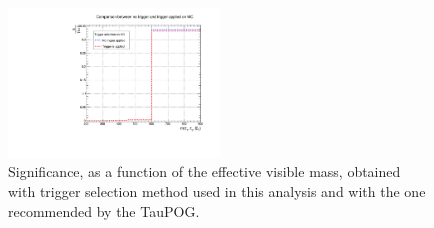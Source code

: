   \begin{tiny} 
 \begin{table}[ht]
  \caption{Signal and background yields obtained with trigger selection method used 
  in this analysis and with the one recommended by the TauPOG. The significance was computed for 
  \mass~$>~$600\GeV. \label{tab:tautriggerappendix} }
 \end{table} 
 \end{tiny} 

\begin{figure}[H]
\begin{center}
\captionsetup[subfloat]{farskip=0pt,captionskip=0.0cm,labelformat=empty}
\includegraphics[clip,width=0.5\textwidth]{figuras/AppendiceA/trigger.pdf}
\end{center}
 \caption{Significance, as a function of the effective visible mass, obtained 
 with trigger selection method used in this analysis and with the one 
 recommended by the TauPOG. \label{TriggerStudy}}
\end{figure}

